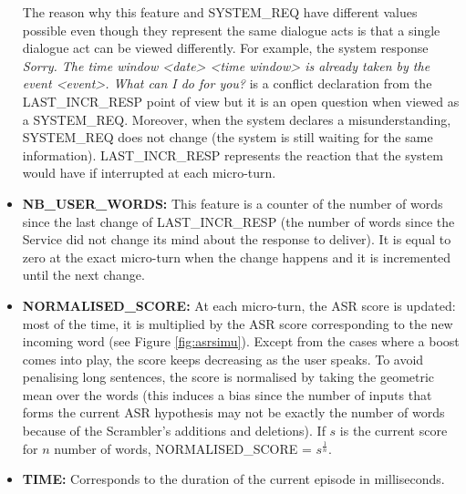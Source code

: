 \begin{itemize}
							The reason why this feature and SYSTEM\_REQ have different values possible even though they represent the same dialogue acts is that a single dialogue act can be viewed differently. For example, the system response \textit{Sorry. The time window <date> <time window> is already taken by the event <event>. What can I do for you?} is a conflict declaration from the LAST\_INCR\_RESP point of view but it is an open question when viewed as a SYSTEM\_REQ. Moreover, when the system declares a misunderstanding, SYSTEM\_REQ does not change (the system is still waiting for the same information). LAST\_INCR\_RESP represents the reaction that the system would have if interrupted at each micro-turn.
						
            \item \textbf{NB\_USER\_WORDS:} This feature is a counter of the number of words since the last change of LAST\_INCR\_RESP (the number of words since the Service did not change its mind about the response to deliver). It is equal to zero at the exact micro-turn when the change happens and it is incremented until the next change.
						
            \item \textbf{NORMALISED\_SCORE:} At each micro-turn, the ASR score is updated: most of the time, it is multiplied by the ASR score corresponding to the new incoming word (see Figure \ref{fig:asrsimu}). Except from the cases where a boost comes into play, the score keeps decreasing as the user speaks. To avoid penalising long sentences, the score is normalised by taking the geometric mean over the words (this induces a bias since the number of inputs that forms the current ASR hypothesis may not be exactly the number of words because of the Scrambler's additions and deletions). If $s$ is the current score for $n$ number of words, NORMALISED\_SCORE = $s^{\frac{1}{n}}$.
            \item \textbf{TIME:} Corresponds to the duration of the current episode in milliseconds.
        \end{itemize}
				
